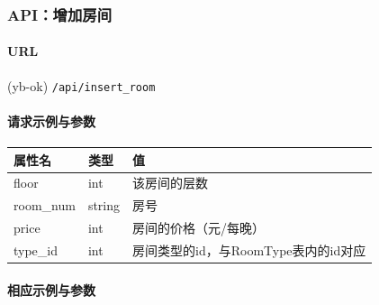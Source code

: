 \documentclass[]{article}
\let\oldparagraph\paragraph
\renewcommand{\paragraph}[1]{\oldparagraph{#1}\mbox{}}
\begin{document}
\hypertarget{apiux589eux52a0ux623fux95f4}{%
\subsubsection{API：增加房间}\label{apiux589eux52a0ux623fux95f4}}

\hypertarget{url-13}{%
\paragraph{URL}\label{url-13}}

(yb-ok) \texttt{/api/insert\_room}

\hypertarget{ux8bf7ux6c42ux793aux4f8bux4e0eux53c2ux6570}{%
\paragraph{请求示例与参数}\label{ux8bf7ux6c42ux793aux4f8bux4e0eux53c2ux6570}}

\begin{Shaded}
\begin{Highlighting}[]
\FunctionTok{\{}
    \FunctionTok{:}\FunctionTok{,}
    \FunctionTok{:}\FunctionTok{,}
    \FunctionTok{:}\FunctionTok{,}
    \FunctionTok{:}
\FunctionTok{\}}
\end{Highlighting}
\end{Shaded}

\begin{longtable}[]{@{}lll@{}}
\toprule
属性名 & 类型 & 值\tabularnewline
\midrule
\endhead
floor & int & 该房间的层数\tabularnewline
room\_num & string & 房号\tabularnewline
price & int & 房间的价格（元/每晚）\tabularnewline
type\_id & int & 房间类型的id，与RoomType表内的id对应\tabularnewline
\bottomrule
\end{longtable}

\hypertarget{ux76f8ux5e94ux793aux4f8bux4e0eux53c2ux6570}{%
\paragraph{相应示例与参数}\label{ux76f8ux5e94ux793aux4f8bux4e0eux53c2ux6570}}

\begin{Shaded}
\begin{Highlighting}[]
\FunctionTok{\{}
    \FunctionTok{:}\FunctionTok{,}
    \FunctionTok{:}
\FunctionTok{\}}
\end{Highlighting}
\end{Shaded}
\end{document}
